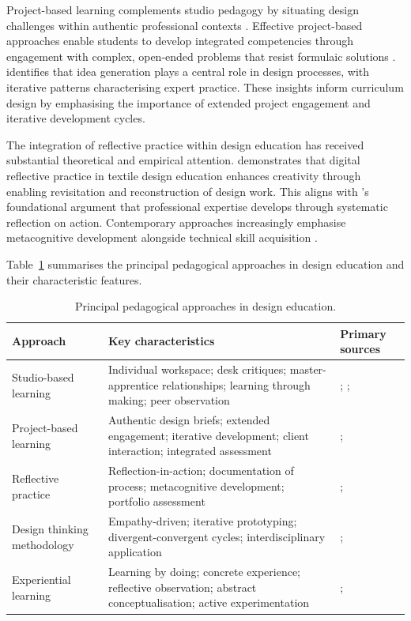 \documentclass[ed]{acnsart}
\begin{document}
	Project-based learning complements studio pedagogy by situating design challenges within authentic professional contexts \cite{Kamalipour2022}. Effective project-based approaches enable students to develop integrated competencies through engagement with complex, open-ended problems that resist formulaic solutions \cite{Tsai2023}. \citet{Sung2019283} identifies that idea generation plays a central role in design processes, with iterative patterns characterising expert practice. These insights inform curriculum design by emphasising the importance of extended project engagement and iterative development cycles.
	
	The integration of reflective practice within design education has received substantial theoretical and empirical attention. \citet{Hameed2023310} demonstrates that digital reflective practice in textile design education enhances creativity through enabling revisitation and reconstruction of design work. This aligns with \citeauthor{Schon1983}'s \cite{Schon1983} foundational argument that professional expertise develops through systematic reflection on action. Contemporary approaches increasingly emphasise metacognitive development alongside technical skill acquisition \cite{Yusuf2026}.
	
	Table~\ref{tab:pedagogical-approaches} summarises the principal pedagogical approaches in design education and their characteristic features.
	
	\begin{table}[htbp]
		\centering
		\caption{Principal pedagogical approaches in design education.}
		\label{tab:pedagogical-approaches}
		\small
		\begin{tabularx}{\textwidth}{@{}p{2.8cm}Xp{4.2cm}@{}}
			\toprule
			\hfil \textbf{Approach} & \hfil \textbf{Key characteristics} & \hfil \textbf{Primary sources} \\
			\midrule
			Studio-based learning & Individual workspace; desk critiques; master-apprentice relationships; learning through making; peer observation & \citet{Schon1983}; \citet{Goldschmidt2010285}; \citet{Mewburn2012363} \\
			\addlinespace
			Project-based learning & Authentic design briefs; extended engagement; iterative development; client interaction; integrated assessment & \citet{Kamalipour2022}; \citet{Tsai2023} \\
			\addlinespace
			Reflective practice & Reflection-in-action; documentation of process; metacognitive development; portfolio assessment & \citet{Schon1983}; \citet{Hameed2023310} \\
			\addlinespace
			Design thinking methodology & Empathy-driven; iterative prototyping; divergent-convergent cycles; interdisciplinary application & \citet{Razzouk2012330}; \citet{Chon2019187} \\
			\addlinespace
			Experiential learning & Learning by doing; concrete experience; reflective observation; abstract conceptualisation; active experimentation & \citet{Kolb1984}; \citet{Duchatelet2024400} \\
			\bottomrule
		\end{tabularx}
	\end{table}
	
\end{document}
